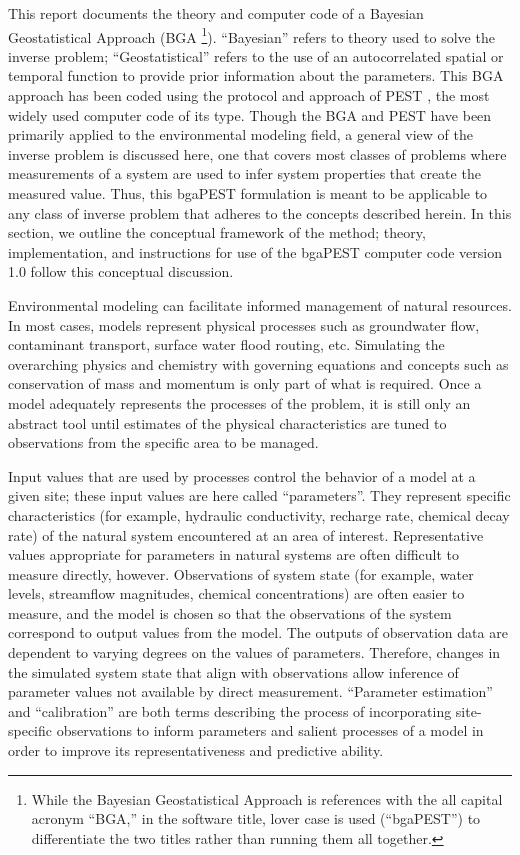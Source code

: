 \documentclass[11pt,oneside,onecolumn]{usgsreport}
\begin{document}
\begin{multicols}{2}
This report documents the theory and computer code of a Bayesian Geostatistical
Approach (BGA%
\footnote[3]{While the Bayesian Geostatistical Approach is references with the
all capital acronym ``BGA,'' in the software title, lover case is
used (``bgaPEST'') to differentiate the two titles rather than running
them all together.%
}). ``Bayesian'' refers to theory used to solve the inverse problem;
``Geostatistical'' refers to the  use of an autocorrelated spatial
or temporal function to provide prior information about the parameters.
This BGA approach has been coded using the protocol and approach of
PEST \citep{PEST,PESTAdd}, the most widely used computer code of
its type. Though the BGA and PEST have been primarily applied to the
environmental modeling field, a general view of the inverse problem
is discussed here, one that covers most classes of problems where
measurements of a system are used to infer system properties that
create the measured value. Thus, this bgaPEST formulation is meant
to be applicable to any class of inverse problem that adheres to the
concepts described herein. In this section, we outline the conceptual
framework of the method; theory, implementation, and instructions
for use of the bgaPEST computer code version 1.0 follow this conceptual
discussion.

Environmental modeling can facilitate informed management of natural
resources. In most cases, models represent physical processes such
as groundwater flow, contaminant transport, surface water flood routing,
etc. Simulating the overarching physics and chemistry with governing
equations and concepts such as conservation of mass and momentum is
only part of what is required. Once a model adequately represents
the processes of the problem, it is still only an abstract tool until
estimates of the physical characteristics are tuned to observations
from the specific area to be managed. 

Input values that are used by processes control the behavior of a
model at a given site; these input values are here called ``parameters''.
They represent specific characteristics (for example, hydraulic conductivity,
recharge rate, chemical decay rate) of the natural system encountered
at an  area of interest. Representative values appropriate for parameters
in natural systems are often difficult to measure directly, however.
Observations of system state (for example, water levels, streamflow
magnitudes, chemical concentrations) are often easier to measure,
and the model is chosen so that the observations of the system correspond
to output values from the model. The outputs of observation data are
dependent to varying degrees on the values of parameters. Therefore,
 changes in the simulated system state that align with observations
allow inference of parameter values not available by direct measurement.
 ``Parameter estimation'' and ``calibration'' are both terms describing
the process of incorporating site-specific observations to inform
parameters and salient processes of a model in order to improve its
representativeness and predictive ability.


\end{multicols}
\end{document}

